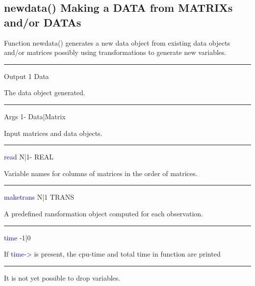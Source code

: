 \subsection{\textcolor{VioletRed}{newdata}() Making a DATA from MATRIXs and/or DATAs}
\label{newdata}
Function \textcolor{VioletRed}{newdata}() generates a new data object from existing data objects and/or
matrices possibly using transformations to generate new variables.
\vspace{0.3cm}
\hrule
\vspace{0.3cm}
\noindent Output \tabto{3cm} 1 \tabto{5cm}  Data \tabto{7cm}
\begin{changemargin}{3cm}{0cm}
\noindent The data object generated.
\end{changemargin}
\vspace{0.3cm}
\hrule
\vspace{0.3cm}
\noindent Args \tabto{3cm} 1- \tabto{5cm}  Data|Matrix \tabto{7cm}
\begin{changemargin}{3cm}{0cm}
\noindent  Input matrices and data objects.
\end{changemargin}
\vspace{0.3cm}
\hrule
\vspace{0.3cm}
\noindent \textcolor{blue}{read} \tabto{3cm} N|1- \tabto{5cm}  REAL \tabto{7cm}
\begin{changemargin}{3cm}{0cm}
\noindent  Variable names for columns of matrices in the order of
matrices.
\end{changemargin}
\vspace{0.3cm}
\hrule
\vspace{0.3cm}
\noindent \textcolor{blue}{maketrans} \tabto{3cm} N|1 \tabto{5cm}   TRANS  \tabto{7cm}
\begin{changemargin}{3cm}{0cm}
\noindent  A predefined ransformation object computed for each observation.
\end{changemargin}
\vspace{0.3cm}
\hrule
\vspace{0.3cm}
\noindent \textcolor{blue}{time} \tabto{3cm} -1|0 \tabto{5cm}    \tabto{7cm}
\begin{changemargin}{3cm}{0cm}
\noindent  If \textcolor{blue}{time->} is present, the cpu-time and total time in function are printed
\end {changemargin}
\hrule
\vspace{0.2cm}
\begin{note}
It is not yet possible to drop variables.
\end{note}
